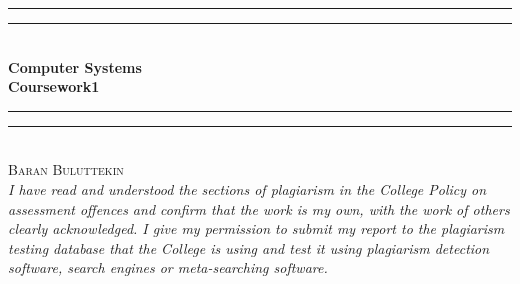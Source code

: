\documentclass[12pt]{article}
\begin{document}
    \begin{titlepage}
        \begin{center}
            \vspace*{.06\textheight}{\scshape\LARGE Birkbeck, University of London\par}\vspace{1.5cm} %
            \rule[0.5ex]{\linewidth}{2pt}\vspace*{-\baselineskip}\vspace*{3.2pt}
            \rule[0.5ex]{\linewidth}{1pt}\\[\baselineskip]
            \huge{\bfseries Computer Systems\\Coursework1}\\[4mm]
            \rule[0.5ex]{\linewidth}{1pt}\vspace*{-\baselineskip}\vspace{3.2pt}
            \rule[0.5ex]{\linewidth}{2pt}\\
            [2.5cm]
        
            \textsc{\Large Baran Buluttekin}\\
            [2.5cm]
            \large \textit{ I have read and understood the sections of plagiarism in the College Policy on assessment offences and confirm that the work is my own, with the work of others clearly acknowledged. I give my permission to submit my report to the plagiarism testing database that the College is using and test it using plagiarism detection software, search engines or meta-searching software.}


        \end{center}
    \end{titlepage}
\end{document}

